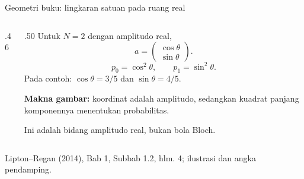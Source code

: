 \documentclass[aspectratio=169,11pt]{beamer}
\newcommand{\bookref}[1]{\par\vfill{\scriptsize\color{gray}Lipton--Regan (2014), Bab 1, #1.}}
\begin{document}
\begin{frame}{Geometri buku: lingkaran satuan pada ruang real}

\begin{columns}[c]
\begin{column}{.46\textwidth}
\centering
{}
\end{column}
\begin{column}{.50\textwidth}
Untuk $N=2$ dengan amplitudo real,
\[
 a=\begin{pmatrix}\cos\theta\\\sin\theta\end{pmatrix}.
\]
\[
 p_0=\cos^2\theta,\qquad p_1=\sin^2\theta.
\]
Pada contoh: $\cos\theta=3/5$ dan $\sin\theta=4/5$.
\par\medskip
\textbf{Makna gambar:} koordinat adalah amplitudo, sedangkan kuadrat panjang komponennya menentukan probabilitas.
\par\medskip
{\small Ini adalah bidang amplitudo real, bukan bola Bloch.}
\end{column}
\end{columns}
\bookref{Subbab 1.2, hlm. 4; ilustrasi dan angka pendamping}

\end{frame}
\end{document}
